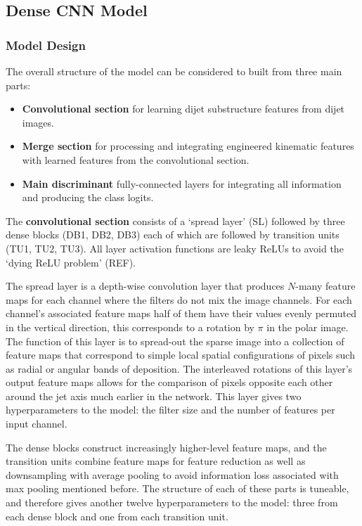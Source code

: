 \subsection{Dense CNN Model}

\subsubsection{Model Design}
The overall structure of the model can be considered to built from three main parts:
\begin{itemize}[noitemsep]
    \item \textbf{Convolutional section} for learning dijet substructure features from dijet images.
    \item \textbf{Merge section} for processing and integrating engineered kinematic features with learned features from the convolutional section.
    \item \textbf{Main discriminant} fully-connected layers for integrating all information and producing the class logits.
\end{itemize}

The \textbf{convolutional section} consists of a `spread layer' (SL) followed by three dense blocks (DB1, DB2, DB3) each of which are followed by transition units (TU1, TU2, TU3). All layer activation functions are leaky ReLUs to avoid the `dying ReLU problem' (REF).

The spread layer is a depth-wise convolution layer that produces $N$-many feature maps for each channel where the filters do not mix the image channels. 
For each channel's associated feature maps half of them have their values evenly permuted in the vertical direction, this corresponds to a rotation by $\pi$ in the polar image.
The function of this layer is to spread-out the sparse image into a collection of feature maps that correspond to simple local spatial configurations of pixels such as radial or angular bands of deposition. 
The interleaved rotations of this layer's output feature maps allows for the comparison of pixels opposite each other around the jet axis much earlier in the network.  
This layer gives two hyperparameters to the model: the filter size and the number of features per input channel.

The dense blocks construct increasingly higher-level feature maps, and the transition units combine feature maps for feature reduction as well as downsampling with average pooling to avoid information loss associated with max pooling mentioned before.  
The structure of each of these parts is tuneable, and therefore gives another twelve hyperparameters to the model: three from each dense block and one from each transition unit. 

